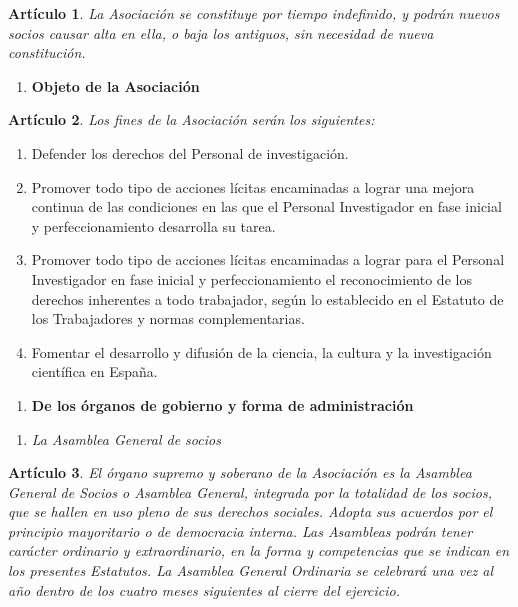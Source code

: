 \documentclass[a4paper,12pt]{article}
\theoremstyle{mystyle}		%
\newtheorem{art}{Artículo}	%
\begin{document}
\begin{onehalfspace}
\begin{art}
La Asociación se constituye por tiempo indefinido, y podrán nuevos socios causar alta en ella, o baja los antiguos, sin necesidad de nueva constitución.
\end{art}

\bigskip

\begin{enumerate}[resume*=capitulo]\centering
 \item \textbf{Objeto de la Asociación}
\end{enumerate}

\begin{art}
Los fines de la Asociación serán los siguientes:
\end{art}
\begin{enumerate}[label={\alph*)}]
 \item Defender los derechos del Personal de investigación.
 \item Promover todo tipo de acciones lícitas encaminadas a lograr una mejora continua de las condiciones en las que el Personal Investigador en fase inicial y perfeccionamiento desarrolla su tarea.
 \item Promover todo tipo de acciones lícitas encaminadas a lograr para el Personal Investigador en fase inicial y perfeccionamiento el reconocimiento de los derechos inherentes a todo trabajador, según lo establecido en el Estatuto de  los Trabajadores y normas complementarias.
 \item Fomentar el desarrollo y difusión de la ciencia, la cultura y la investigación científica en España.
\end{enumerate}

\bigskip

\begin{enumerate}[resume*=capitulo]\centering
 \item \textbf{De los órganos de gobierno y forma de administración}
\end{enumerate}

\begin{enumerate}[label={\it SECCIÓN \arabic*ª.}, labelindent=1\parindent, leftmargin=*, series=seccion]
 \item \textit{La Asamblea General de socios}	%
\end{enumerate}

\begin{art}
El órgano supremo y soberano de la Asociación es la Asamblea General de Socios o Asamblea General, integrada por la totalidad de los socios, que se hallen en uso pleno de sus derechos sociales. Adopta sus acuerdos por el principio mayoritario o de democracia interna. Las Asambleas podrán tener carácter ordinario y extraordinario, en la forma y competencias que se indican en los presentes Estatutos. La Asamblea General Ordinaria se celebrará una vez al año dentro de los cuatro meses siguientes al cierre del ejercicio.
\end{art}


\end{onehalfspace}
\end{document}
